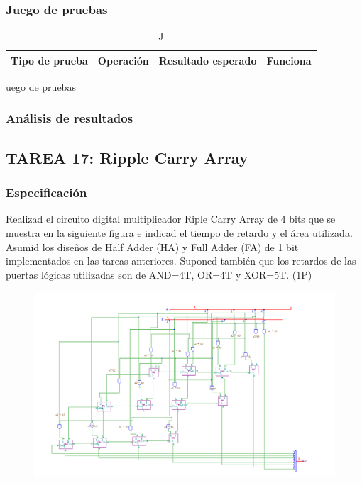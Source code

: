 \documentclass{article}
\begin{document}
		\subsubsection*{Juego de pruebas}
		\begin{table}[h]
			\begin{center}
				\begin{tabular}{| c | c | c | c |}
					\hline
					Tipo de prueba & Operación & Resultado esperado & Funciona \\ \hline
					
					
				\end{tabular}
				\caption Juego de pruebas
			\end{center}
		\end{table}



		\subsubsection*{Análisis de resultados}

	\subsection{TAREA 17: Ripple Carry Array}
		\subsubsection*{Especificación}
		Realizad el circuito digital multiplicador Riple Carry Array de 4 bits que se muestra en
		la siguiente figura e indicad el tiempo de retardo y el área utilizada. Asumid los diseños de Half
		Adder (HA) y Full Adder (FA) de 1 bit implementados en las tareas anteriores. Suponed también
		que los retardos de las puertas lógicas utilizadas son de AND=4T, OR=4T y XOR=5T. (1P)

		\begin{figure}[ht]
			\includegraphics[width=0.8\linewidth]{RCA4}
			\centering
		\end{figure}
\end{document}
